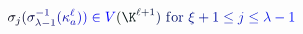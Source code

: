 \documentclass[12pt]{article}
\begin{document}
\makeatletter
\renewcommand*{\@textcolor}[3]{%
  \protect\leavevmode
  \begingroup
    \color#1{#2}#3%
  \endgroup
}
\makeatother
\begin{displaymath}
\mathcolor[RGB]{0,0,15}{\sigma} _ { \mathcolor[RGB]{0,0,30}{j} } \mathcolor[RGB]{0,0,45}{(} \mathcolor[RGB]{0,0,60}{\sigma} _ { \mathcolor[RGB]{0,0,75}{\lambda} \mathcolor[RGB]{0,0,90}{-} \mathcolor[RGB]{0,0,105}{1} } ^ { \mathcolor[RGB]{0,0,120}{-} \mathcolor[RGB]{0,0,135}{1} } \mathcolor[RGB]{0,0,150}{(} \mathcolor[RGB]{0,0,165}{\kappa} _ { \mathcolor[RGB]{0,0,180}{a} } ^ { \mathcolor[RGB]{0,0,195}{\ell} } \mathcolor[RGB]{0,0,210}{)} \mathcolor[RGB]{0,0,225}{)} \mathcolor[RGB]{0,0,240}{\in} \mathcolor[RGB]{0,0,255}{V} \mathcolor[RGB]{0,15,0}{(} \mathcolor[RGB]{0,15,15}{\K} ^ { \mathcolor[RGB]{0,15,30}{\ell} \mathcolor[RGB]{0,15,45}{+} \mathcolor[RGB]{0,15,60}{1} } \mathcolor[RGB]{0,15,75}{)} \ \mathrm { \mathcolor[RGB]{0,15,90}{f} \mathcolor[RGB]{0,15,105}{o} \mathcolor[RGB]{0,15,120}{r} ~ } \mathcolor[RGB]{0,15,135}{\xi} \mathcolor[RGB]{0,15,150}{+} \mathcolor[RGB]{0,15,165}{1} \mathcolor[RGB]{0,15,180}{\leq} \mathcolor[RGB]{0,15,195}{j} \mathcolor[RGB]{0,15,210}{\leq} \mathcolor[RGB]{0,15,225}{\lambda} \mathcolor[RGB]{0,15,240}{-} \mathcolor[RGB]{0,15,255}{1}
\end{displaymath}
\end{document}
